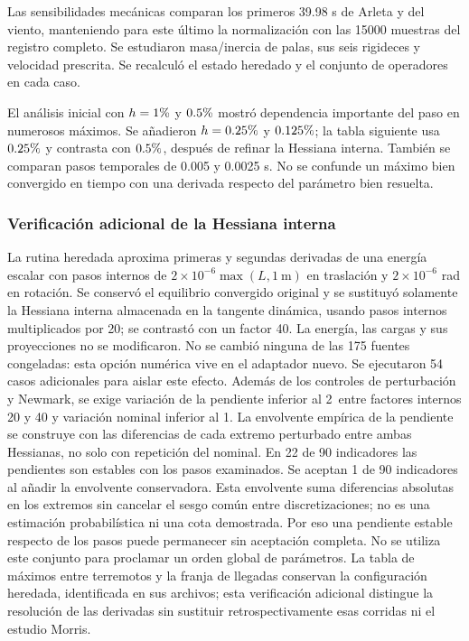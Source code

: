 \documentclass[11pt,a4paper]{article}
\newcommand{\pct}{\text{\char37}}
\begin{document}
Las sensibilidades mecánicas comparan los primeros 39.98 s de Arleta y del viento, manteniendo para este último la normalización con las 15000 muestras del registro completo. Se estudiaron masa/inercia de palas, sus seis rigideces y velocidad prescrita. Se recalculó el estado heredado y el conjunto de operadores en cada caso.

El análisis inicial con $h=1\pct$ y $0.5\pct$ mostró dependencia importante del paso en numerosos máximos. Se añadieron $h=0.25\pct$ y $0.125\pct$; la tabla siguiente usa $0.25\pct$ y contrasta con $0.5\pct$, después de refinar la Hessiana interna. También se comparan pasos temporales de 0.005 y 0.0025 s. No se confunde un máximo bien convergido en tiempo con una derivada respecto del parámetro bien resuelta.

\subsubsection*{Verificación adicional de la Hessiana interna}
La rutina heredada aproxima primeras y segundas derivadas de una energía escalar con pasos internos de $2\times10^{-6}\max(L,1\ \mathrm{m})$ en traslación y $2\times10^{-6}$ rad en rotación. Se conservó el equilibrio convergido original y se sustituyó solamente la Hessiana interna almacenada en la tangente dinámica, usando pasos internos multiplicados por 20; se contrastó con un factor 40. La energía, las cargas y sus proyecciones no se modificaron. No se cambió ninguna de las 175 fuentes congeladas: esta opción numérica vive en el adaptador nuevo. Se ejecutaron 54 casos adicionales para aislar este efecto. Además de los controles de perturbación y Newmark, se exige variación de la pendiente inferior al 2\pct\ entre factores internos 20 y 40 y variación nominal inferior al 1\pct. La envolvente empírica de la pendiente se construye con las diferencias de cada extremo perturbado entre ambas Hessianas, no solo con repetición del nominal. En 22 de 90 indicadores las pendientes son estables con los pasos examinados. Se aceptan 1 de 90 indicadores al añadir la envolvente conservadora. Esta envolvente suma diferencias absolutas en los extremos sin cancelar el sesgo común entre discretizaciones; no es una estimación probabilística ni una cota demostrada. Por eso una pendiente estable respecto de los pasos puede permanecer sin aceptación completa. No se utiliza este conjunto para proclamar un orden global de parámetros. La tabla de máximos entre terremotos y la franja de llegadas conservan la configuración heredada, identificada en sus archivos; esta verificación adicional distingue la resolución de las derivadas sin sustituir retrospectivamente esas corridas ni el estudio Morris.
\end{document}
